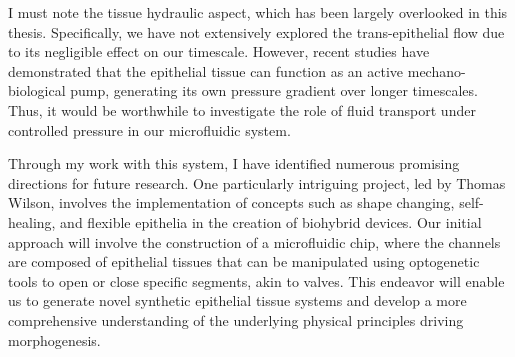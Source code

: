 I must note the tissue hydraulic aspect, which has been largely
overlooked in this thesis. Specifically, we have not extensively
explored the trans-epithelial flow due to its negligible effect on our
timescale. However, recent studies have demonstrated that the epithelial
tissue can function as an active mechano-biological pump, generating its
own pressure gradient over longer timescales. Thus, it would be
worthwhile to investigate the role of fluid transport under controlled
pressure in our microfluidic system.

Through my work with this system, I have identified numerous promising
directions for future research. One particularly intriguing project, led
by Thomas Wilson, involves the implementation of concepts such as shape
changing, self-healing, and flexible epithelia in the creation of
biohybrid devices. Our initial approach will involve the construction of
a microfluidic chip, where the channels are composed of epithelial
tissues that can be manipulated using optogenetic tools to open or close
specific segments, akin to valves. This endeavor will enable us to
generate novel synthetic epithelial tissue systems and develop a more
comprehensive understanding of the underlying physical principles
driving morphogenesis.
